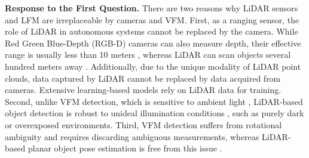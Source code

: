 \par
\noindent\textbf{Response to the First Question.} There are two reasons why LiDAR sensors and LFM are irreplaceable by cameras and VFM. 
First, as a ranging sensor, the role of LiDAR in autonomous systems \cite{waabi,waymo,cd} cannot be replaced by the camera. While Red Green Blue-Depth (RGB-D) cameras can also measure depth, their effective range is usually less than 10 meters \cite{3dmatch,eth,scan}, whereas LiDAR can scan objects several hundred meters away \cite{loam,traj,rangenet}.
Additionally, due to the unique modality of LiDAR point clouds, data captured by LiDAR cannot be replaced by data acquired from cameras. Extensive learning-based models \cite{rangenet,cd,mending} rely on LiDAR data for training.
%
Second, unlike VFM detection, which is sensitive to ambient light \cite{ap3,aruco,cctag}, LiDAR-based object detection is robust to unideal illumination conditions \cite{lt,iilfm}, such as purely dark or overexposed environments. Third, VFM detection suffers from rotational ambiguity \cite{munoz2018,qingdao,munoz2019} and requires discarding ambiguous measurements, whereas LiDAR-based planar object pose estimation is free from this issue \cite{lt}.
\par

